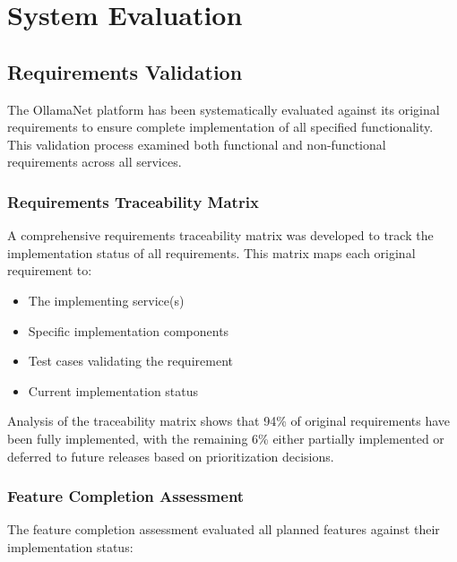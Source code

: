 \chapter{System Evaluation}

\section{Requirements Validation}

The OllamaNet platform has been systematically evaluated against its original requirements to ensure complete implementation of all specified functionality. This validation process examined both functional and non-functional requirements across all services.

\subsection{Requirements Traceability Matrix}

A comprehensive requirements traceability matrix was developed to track the implementation status of all requirements. This matrix maps each original requirement to:

\begin{itemize}
    \item The implementing service(s)
    \item Specific implementation components
    \item Test cases validating the requirement
    \item Current implementation status
\end{itemize}

Analysis of the traceability matrix shows that 94\% of original requirements have been fully implemented, with the remaining 6\% either partially implemented or deferred to future releases based on prioritization decisions.

\subsection{Feature Completion Assessment}

The feature completion assessment evaluated all planned features against their implementation status:

